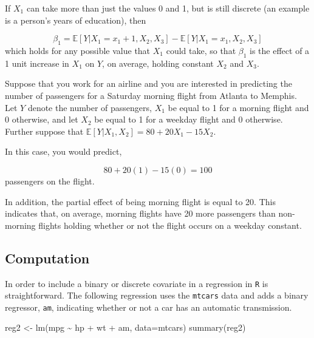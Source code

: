 \documentclass[
  letterpaper,
  DIV=11,
  numbers=noendperiod]{scrreprt}
\newenvironment{Shaded}{\begin{snugshade}}{\end{snugshade}}
\newcommand{\AttributeTok}[1]{\textcolor[rgb]{0.40,0.45,0.13}{#1}}
\newcommand{\FunctionTok}[1]{\textcolor[rgb]{0.28,0.35,0.67}{#1}}
\newcommand{\NormalTok}[1]{\textcolor[rgb]{0.00,0.23,0.31}{#1}}
\newcommand{\OtherTok}[1]{\textcolor[rgb]{0.00,0.23,0.31}{#1}}
\newcommand{\SpecialCharTok}[1]{\textcolor[rgb]{0.37,0.37,0.37}{#1}}
\begin{document}
If \(X_1\) can take more than just the values 0 and 1, but is still
discrete (an example is a person's years of education), then

\[
  \beta_1 = \mathbb{E}[Y | X_1=x_1+1, X_2, X_3] - \mathbb{E}[Y|X_1=x_1, X_2, X_3]
\] which holds for any possible value that \(X_1\) could take, so that
\(\beta_1\) is the effect of a 1 unit increase in \(X_1\) on \(Y\), on
average, holding constant \(X_2\) and \(X_3\).

Suppose that you work for an airline and you are interested in
predicting the number of passengers for a Saturday morning flight from
Atlanta to Memphis. Let \(Y\) denote the number of passengers, \(X_1\)
be equal to 1 for a morning flight and 0 otherwise, and let \(X_2\) be
equal to 1 for a weekday flight and 0 otherwise. Further suppose that
\(\mathbb{E}[Y|X_1,X_2] = 80 + 20 X_1 - 15 X_2\).

In this case, you would predict,

\[
  80 + 20 (1) - 15 (0) = 100
\] passengers on the flight.

In addition, the partial effect of being morning flight is equal to 20.
This indicates that, on average, morning flights have 20 more passengers
than non-morning flights holding whether or not the flight occurs on a
weekday constant.

\subsection{Computation}\label{computation-2}

In order to include a binary or discrete covariate in a regression in
\texttt{R} is straightforward. The following regression uses the
\texttt{mtcars} data and adds a binary regressor, \texttt{am},
indicating whether or not a car has an automatic transmission.

\begin{Shaded}
\begin{Highlighting}[]
\NormalTok{reg2 }\OtherTok{\textless{}{-}} \FunctionTok{lm}\NormalTok{(mpg }\SpecialCharTok{\textasciitilde{}}\NormalTok{ hp }\SpecialCharTok{+}\NormalTok{ wt }\SpecialCharTok{+}\NormalTok{ am, }\AttributeTok{data=}\NormalTok{mtcars)}
\FunctionTok{summary}\NormalTok{(reg2)}
\end{Highlighting}
\end{Shaded}
\end{document}
